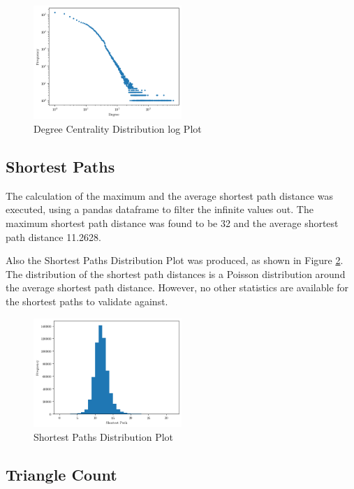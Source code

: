 \documentclass[conference]{IEEEtran}
\begin{document}
\begin{figure}[htbp]
\centerline{\includegraphics[width=0.5\textwidth]{degree-centrality-distribution.png}}
\caption{Degree Centrality Distribution log Plot}
\label{degreePlot}
\end{figure}

\subsection{Shortest Paths}

The calculation of the maximum and the average shortest path distance was executed, using a pandas dataframe \cite{b15} to filter the infinite values out. The maximum shortest path distance was found to be 32 and the average shortest path distance 11.2628.

Also the Shortest Paths Distribution Plot was produced, as shown in Figure \ref{sPathsPlot}. The distribution of the shortest path distances is a Poisson distribution around the average shortest path distance. However, no other statistics are available for the shortest paths to validate against.

\begin{figure}[htbp]
\centerline{\includegraphics[width=0.5\textwidth]{shortest-paths-distribution.png}}
\caption{Shortest Paths Distribution Plot}
\label{sPathsPlot}
\end{figure}

\subsection{Triangle Count}
\end{document}
